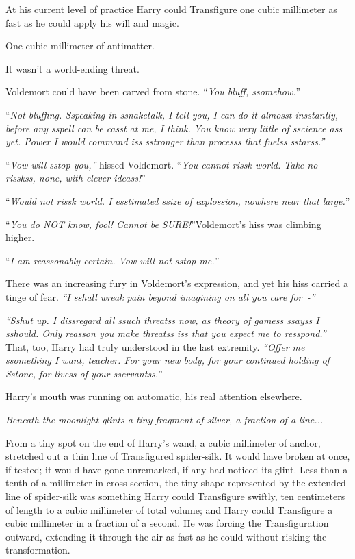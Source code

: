 At his current level of practice Harry could Transfigure one cubic millimeter as fast as he could apply his will and magic.

One cubic millimeter of antimatter.

It wasn't a world-ending threat.

Voldemort could have been carved from stone. ``\emph{You bluff, ssomehow.}''

``\emph{Not bluffing. Sspeaking in ssnaketalk, I tell you, I can do it almosst insstantly, before any sspell can be casst at me, I think. You know very little of sscience ass yet. Power I would command iss sstronger than processs that fuelss sstarss.''}

``\emph{Vow will sstop you,''} hissed Voldemort. ``\emph{You cannot rissk world. Take no risskss, none, with clever ideass!}''

``\emph{Would not rissk world. I esstimated ssize of explossion, nowhere near that large.}''

``\emph{You do NOT know, fool! Cannot be SURE!}''Voldemort's hiss was climbing higher.

``\emph{I am reassonably certain. Vow will not sstop me.''}

There was an increasing fury in Voldemort's expression, and yet his hiss carried a tinge of fear. \emph{``I sshall wreak pain beyond imagining on all you care for~-''}

\emph{``Sshut up. I dissregard all ssuch threatss now, as theory of gamess ssayss I sshould. Only reasson you make threatss iss that you expect me to resspond.''} That, too, Harry had truly understood in the last extremity. \emph{``Offer me ssomething I want, teacher. For your new body, for your continued holding of Sstone, for livess of your sservantss.}''

Harry's mouth was running on automatic, his real attention elsewhere.

\emph{Beneath the moonlight glints a tiny fragment of silver, a fraction of a line...}

From a tiny spot on the end of Harry's wand, a cubic millimeter of anchor, stretched out a thin line of Transfigured spider-silk. It would have broken at once, if tested; it would have gone unremarked, if any had noticed its glint. Less than a tenth of a millimeter in cross-section, the tiny shape represented by the extended line of spider-silk was something Harry could Transfigure swiftly, ten centimeters of length to a cubic millimeter of total volume; and Harry could Transfigure a cubic millimeter in a fraction of a second. He was forcing the Transfiguration outward, extending it through the air as fast as he could without risking the transformation.

